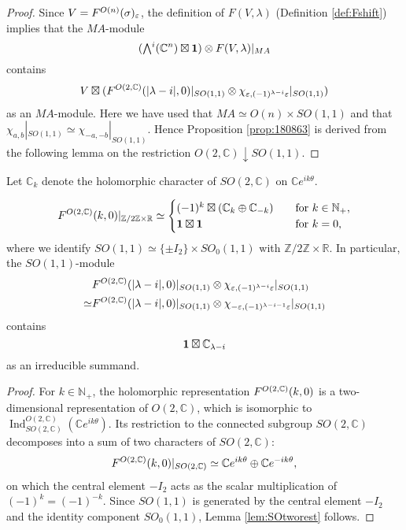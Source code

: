\begin{proof}
Since $V = F^{{O(n)}}({\sigma})_{\varepsilon}$, 
 the definition of $F(V,\lambda)$
 (Definition \ref{def:Fshift})
 implies that the $M A$-module
\[
  (\Exterior^i({\mathbb{C}}^n) \boxtimes {\bf{1}}) \otimes F(V,\lambda)|_{M A}
\]
 contains 
\[
   V \boxtimes 
  (F^{{O(2,{\mathbb{C}})}}({|\lambda-i|,0})|_{S O(1,1)} 
   \otimes 
   \chi_{\varepsilon,(-1)^{\lambda-i}\varepsilon}|_{S O(1,1)})
\]
as an $M A$-module.  
Here we have used that $M A \simeq O(n) \times S O (1,1)$
 and that $\chi_{a,b}|_{S O(1,1)} \simeq \chi_{-a,-b}|_{S O(1,1)}$.  
Hence Proposition \ref{prop:180863} is derived from the following lemma
 on the restriction $O(2,{\mathbb{C}}) \downarrow S O(1,1)$.  
\end{proof}


Let ${\mathbb{C}}_k$ denote the holomorphic character 
 of $S O(2,{\mathbb{C}})$ on ${\mathbb{C}} e^{i k \theta}$.  

\begin{lemma}
\label{lem:SOtworest}
\[
  F^{{O(2,{\mathbb{C}})}}({k,0})|_{{\mathbb{Z}} / 2 {\mathbb{Z}} \times {\mathbb{R}}}
  \simeq
\begin{cases}
(-1)^k \boxtimes ({\mathbb{C}}_k \oplus {\mathbb{C}}_{-k}) 
\quad
&\text{for $k \in {\mathbb{N}}_+$}, 
\\
{\bf{1}} \boxtimes {\bf{1}}
\quad
&\text{for $k =0$, }
\end{cases}
\]
where we identify $S O(1,1) \simeq \{\pm I_2\} \times S O_0(1,1)$
 with ${\mathbb{Z}} / 2 {\mathbb{Z}} \times {\mathbb{R}}$.  
In particular, 
the $SO(1,1)$-module
\begin{align*}
&F^{{O(2,{\mathbb{C}})}}({|\lambda-i|,0})|_{S O(1,1)} 
   \otimes 
   \chi_{\varepsilon,(-1)^{\lambda-i}\varepsilon}|_{S O(1,1)}
\\
\simeq
&F^{{O(2,{\mathbb{C}})}}({|\lambda-i|,0})|_{S O(1,1)} 
   \otimes 
   \chi_{-\varepsilon,(-1)^{\lambda-i-1}\varepsilon}|_{S O(1,1)}
\end{align*}
contains
\[
  {\bf{1}} \boxtimes {\mathbb{C}}_{\lambda -i}
\]
 as an irreducible summand.  
\end{lemma}

\begin{proof}
For $k \in {\mathbb{N}}_+$, 
 the holomorphic representation $F^{{O(2,{\mathbb{C}})}}({k,0})$
 is a two-dimensional representation 
 of $O(2,{\mathbb{C}})$, 
 which is isomorphic to $\operatorname{Ind}_{S O(2,{\mathbb{C}})}^{O(2,{\mathbb{C}})}({\mathbb{C}} e^{i k \theta})$.  
Its restriction to the connected subgroup $S O(2,{\mathbb{C}})$
 decomposes into a sum of two characters
 of $S O(2,{\mathbb{C}})$:  
\[
   F^{{O(2,{\mathbb{C}})}}({k,0})|_{S O(2,{\mathbb{C}})}
  \simeq
  {\mathbb{C}} e^{i k \theta} \oplus {\mathbb{C}} e^{-i k \theta}, 
\]
on which the central element $-I_2$ acts
 as the scalar multiplication of $(-1)^k=(-1)^{-k}$.  
Since $S O(1,1)$ is generated by the central element
 $-I_2$ 
 and the identity component $S O_0(1,1)$, 
 Lemma \ref{lem:SOtworest} follows.  
\end{proof}

